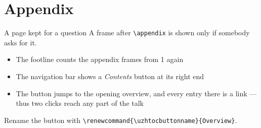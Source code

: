 \documentclass[aspectratio=169,onlytextwidth]{beamer}
\begin{document}
\nocite{*} %


\uzhthanksframe


%
\appendix
\section*{Appendix}

\begin{frame}{A page kept for a question}
  A frame after \texttt{\textbackslash appendix} is shown only if somebody
  asks for it.

  \begin{itemize}
    \item The footline counts the appendix frames from 1 again
    \item The navigation bar shows a \emph{Contents} button at its right end
    \item The button jumps to the opening overview, and every entry there is a
      link --- thus two clicks reach any part of the talk
  \end{itemize}

  Rename the button with
  \texttt{\textbackslash renewcommand\{\textbackslash uzhtocbuttonname\}\{Overview\}}.
\end{frame}
\end{document}
